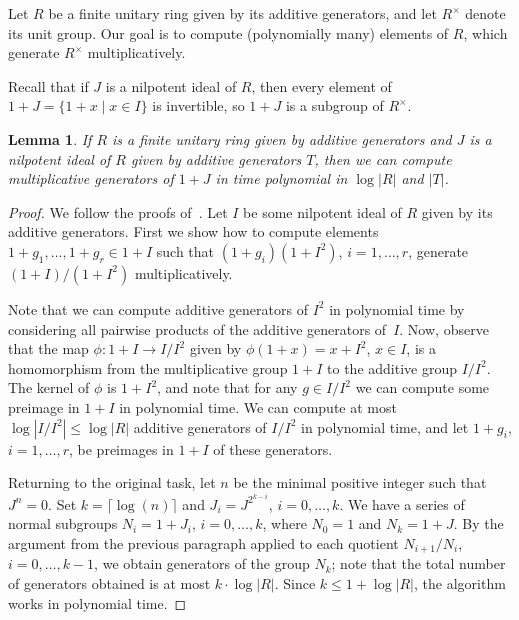 \documentclass{article}
\newtheorem{lemma}[theorem]{Lemma}
\begin{document}
Let \( R \) be a finite unitary ring given by its additive generators, and let \( R^\times \) denote its unit group.
Our goal is to compute (polynomially many) elements of \( R \), which generate \( R^\times \) multiplicatively.

Recall that if \( J \) is a nilpotent ideal of \( R \), then every element of \( 1 + J = \{ 1 + x \mid x \in I \} \) is invertible,
so \( 1 + J \) is a subgroup of \( R^\times \).

\begin{lemma}\label{ideal}
	If \( R \) is a finite unitary ring given by additive generators
	and \( J \) is a nilpotent ideal of \( R \) given by additive generators \( T \), then we can compute multiplicative generators
	of \( 1 + J \) in time polynomial in \( \log |R| \) and \( |T| \).
\end{lemma}
\begin{proof}
	We follow the proofs of~\cite[Lemma~4.1 and Proposition~4.2]{hofmann}.
	Let \( I \) be some nilpotent ideal of \( R \) given by its additive generators. First we show how to compute elements \( 1+g_1, \dots, 1+g_r \in 1 + I \)
	such that \( (1+g_i)(1+I^2) \), \( i = 1, \dots, r \), generate \( (1+I)/(1+I^2) \) multiplicatively.

	Note that we can compute additive generators of \( I^2 \) in polynomial time by considering all pairwise products of the additive generators of~\( I \).
	Now, observe that the map \( \phi : 1+I \to I/I^2 \) given by \( \phi(1+x) = x+I^2 \), \( x \in I \), is a homomorphism
	from the multiplicative group \( 1+I \) to the additive group \( I/I^2 \). The kernel of \( \phi \) is \( 1+I^2 \),
	and note that for any \( g \in I/I^2 \) we can compute some preimage in \( 1+I \) in polynomial time.	
	We can compute at most \( \log |I/I^2| \leq \log |R| \) additive generators of \( I/I^2 \) in polynomial time,
	and let \( 1 + g_i \), \( i = 1, \dots, r \), be preimages in \( 1+I \) of these generators.

	Returning to the original task, let \( n \) be the minimal positive integer such that \( J^n = 0 \).
	Set \( k = \lceil \log(n) \rceil \) and \( J_i = J^{2^{k-i}} \), \( i = 0, \dots, k \).
	We have a series of normal subgroups \( N_i = 1 + J_i \), \( i = 0, \dots, k \), where \( N_0 = 1 \) and \( N_k = 1 + J \).
	By the argument from the previous paragraph applied to each quotient \( N_{i+1}/N_i \), \( i = 0, \dots, k-1 \),
	we obtain generators of the group \( N_k \); note that the total number of generators obtained is at most \( k \cdot \log |R| \).
	Since \( k \leq 1 + \log |R| \), the algorithm works in polynomial time.
\end{proof}
\end{document}
